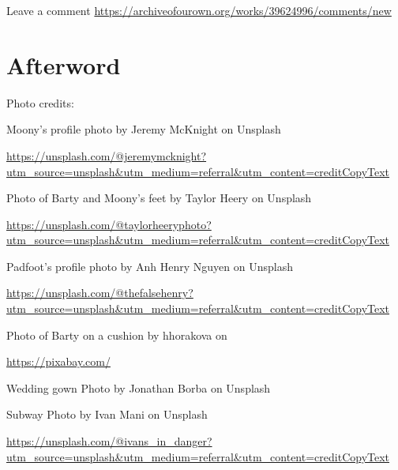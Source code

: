 \documentclass[12pt,twoside,openright]{memoir}
\begin{document}
Leave a comment \url{https://archiveofourown.org/works/39624996/comments/new}
\begin{center}
{
	\abnormalparskip{0em}
}
\end{center}

\chapter*{Afterword}
Photo credits:

Moony's profile photo by Jeremy McKnight on Unsplash

\href{https://unsplash.com/@jeremymcknight?utm_source=unsplash&utm_medium=referral&utm_content=creditCopyText}{\url{https://unsplash.com/@jeremymcknight?utm_source=unsplash&utm_medium=referral&utm_content=creditCopyText}}

Photo of Barty and Moony's feet by Taylor Heery on Unsplash 

\href{https://unsplash.com/@taylorheeryphoto?utm_source=unsplash&utm_medium=referral&utm_content=creditCopyText}{\url{https://unsplash.com/@taylorheeryphoto?utm_source=unsplash&utm_medium=referral&utm_content=creditCopyText}}

Padfoot's profile photo by Anh Henry Nguyen on Unsplash

\href{https://unsplash.com/@thefalsehenry?utm_source=unsplash&utm_medium=referral&utm_content=creditCopyText}{\url{https://unsplash.com/@thefalsehenry?utm_source=unsplash&utm_medium=referral&utm_content=creditCopyText}}


Photo of Barty on a cushion by hhorakova on

\href{https://pixabay.com/}{\url{https://pixabay.com/}}

Wedding gown Photo by Jonathan Borba on Unsplash

Subway Photo by Ivan Mani on Unsplash

\href{https://unsplash.com/@ivans_in_danger?utm_source=unsplash&utm_medium=referral&utm_content=creditCopyText}{\url{https://unsplash.com/@ivans_in_danger?utm_source=unsplash&utm_medium=referral&utm_content=creditCopyText}}
\end{document}
